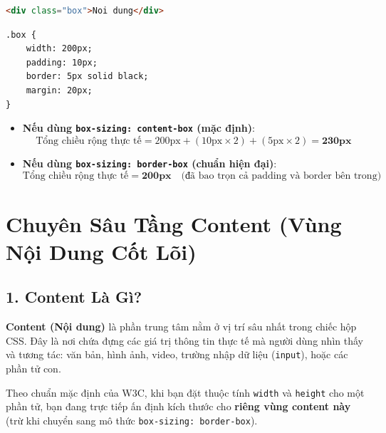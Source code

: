 \documentclass[11pt,oneside]{book}
\newcommand{\codeinline}[1]{\textcolor{accentOrange}{\texttt{#1}}}
\begin{document}
\begin{codeWindow}
\begin{lstlisting}[language=HTML]
<div class="box">Noi dung</div>
\end{lstlisting}
\begin{lstlisting}[language=CSS3]
.box {
    width: 200px;
    padding: 10px;
    border: 5px solid black;
    margin: 20px;
}
\end{lstlisting}
\end{codeWindow}

\begin{itemize}[leftmargin=1.5em, itemsep=3pt, parsep=0pt]
    \item \textbf{Nếu dùng \codeinline{box-sizing: content-box} (mặc định)}:
    \[
    \text{Tổng chiều rộng thực tế} = 200\text{px} + (10\text{px} \times 2) + (5\text{px} \times 2) = \mathbf{230\text{px}}
    \]
    \item \textbf{Nếu dùng \codeinline{box-sizing: border-box} (chuẩn hiện đại)}:
    \[
    \text{Tổng chiều rộng thực tế} = \mathbf{200\text{px}} \quad \text{(đã bao trọn cả padding và border bên trong)}
    \]
\end{itemize}

\section{Chuyên Sâu Tầng Content (Vùng Nội Dung Cốt Lõi)}
\label{sec:box_model_content_deep_dive}

\subsection{1. Content Là Gì?}

\textbf{Content (Nội dung)} là phần trung tâm nằm ở vị trí sâu nhất trong chiếc hộp CSS. Đây là nơi chứa đựng các giá trị thông tin thực tế mà người dùng nhìn thấy và tương tác: văn bản, hình ảnh, video, trường nhập dữ liệu (\codeinline{input}), hoặc các phần tử con.

\begin{noteBox}
Theo chuẩn mặc định của W3C, khi bạn đặt thuộc tính \codeinline{width} và \codeinline{height} cho một phần tử, bạn đang trực tiếp ấn định kích thước cho \textbf{riêng vùng content này} (trừ khi chuyển sang mô thức \codeinline{box-sizing: border-box}).
\end{noteBox}
\end{document}
